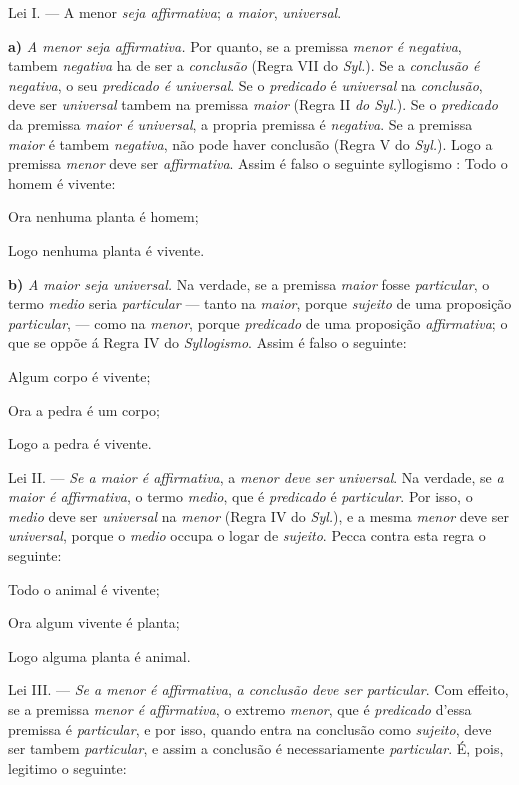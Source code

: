 Lei I. --- A menor \emph{seja affirmativa}; \emph{a maior}, \emph{universal}.

\textbf{a)} \emph{A menor seja affirmativa.} Por quanto, se a premissa \emph{menor é negativa}, tambem \emph{negativa} ha de ser a \emph{conclusão} (Regra VII do \emph{Syl.}). Se a \emph{conclusão é negativa}, o seu \emph{predicado é universal}. Se o \emph{predicado} é \emph{universal} na \emph{conclusão}, deve ser \emph{universal} tambem na premissa \emph{maior} (Regra II \emph{do Syl.}). Se o \emph{predicado} da premissa \emph{maior é universal}, a propria premissa é \emph{negativa}. Se a premissa \emph{maior} é tambem \emph{negativa}, não pode haver conclusão (Regra V do \emph{Syl.}). Logo a premissa \emph{menor} deve ser \emph{affirmativa}. Assim é falso o seguinte syllogismo : Todo o homem é vivente:

Ora nenhuma planta é homem;

Logo nenhuma planta é vivente.

\textbf{b)} \emph{A maior seja universal.} Na verdade, se a premissa \emph{maior} fosse \emph{particular}, o termo \emph{medio} seria \emph{particular} --- tanto na \emph{maior}, porque \emph{sujeito} de uma proposição \emph{particular}, --- como na \emph{menor}, porque \emph{predicado} de uma proposição \emph{affirmativa}; o que se oppõe á Regra IV do \emph{Syllogismo}. Assim é falso o seguinte:

Algum corpo é vivente;

Ora a pedra é um corpo;

Logo a pedra é vivente.

Lei II. --- \emph{Se a maior é affirmativa}, a \emph{menor deve ser universal}. Na verdade, se \emph{a maior é affirmativa}, o termo \emph{medio}, que é \emph{predicado} é \emph{particular}. Por isso, o \emph{medio} deve ser \emph{universal} na \emph{menor} (Regra IV do \emph{Syl.}), e a mesma \emph{menor} deve ser \emph{universal}, porque o \emph{medio} occupa o logar de \emph{sujeito}. Pecca contra esta regra o seguinte:

Todo o animal é vivente;

Ora algum vivente é planta;

Logo alguma planta é animal.

Lei III. --- \emph{Se a menor é affirmativa}, \emph{a conclusão deve ser particular}. Com effeito, se a premissa \emph{menor é affirmativa}, o extremo \emph{menor}, que é \emph{predicado} d'essa premissa é \emph{particular}, e por isso, quando entra na conclusão como \emph{sujeito}, deve ser tambem \emph{particular}, e assim a conclusão é necessariamente \emph{particular}. É, pois, legitimo o seguinte:

